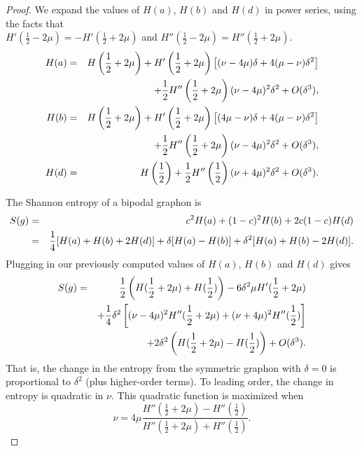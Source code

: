 \documentclass[12pt]{amsart}
\newcommand{\1}{\mathbf{1}}
\begin{document}
\begin{proof}
We expand the values of $H(a)$, $H(b)$ and $H(d)$ in power series, using the facts that \\
$H'(\frac12 - 2\mu) = -H'(\frac12 + 2\mu)$ and $H''(\frac12 - 2\mu) = H''(\frac12 + 2\mu)$. 
\begin{eqnarray}
H(a) & = & H\left (\frac12 + 2\mu \right ) + H'\left (\frac12+2\mu\right ) \left [ (\nu-4\mu)\delta + 4(\mu-\nu)\delta^2 \right ] \cr && 
+ \frac12 H''\left (\frac12+2\mu\right )(\nu-4\mu)^2 \delta^2 + O(\delta^3), \cr 
H(b) & = & H\left (\frac12 + 2\mu\right ) + H'\left (\frac12+2\mu\right ) \left [(4\mu-\nu)\delta + 4(\mu-\nu)\delta^2 \right ] \cr && 
+ \frac12 H''\left (\frac12+2\mu \right )(\nu-4\mu)^2 \delta^2 + O(\delta^3), \cr 
H(d) & = & H\left (\frac12\right ) + \frac12 H''\left (\frac12 \right ) (\nu+4\mu)^2 \delta^2 + O(\delta^3).\cr
\end{eqnarray}

The Shannon entropy of a bipodal graphon is 
\begin{eqnarray}
S(g) &=& c^2 H(a) + (1-c)^2 H(b) + 2c(1-c) H(d) \cr 
& = & \frac14[H(a)+H(b)+2H(d)] + \delta [H(a)-H(b)] + \delta^2[H(a)+H(b)-2H(d)]. 
\end{eqnarray}
Plugging in our previously computed values of $H(a)$, $H(b)$ and $H(d)$ gives
\begin{eqnarray}\label{S-is}
S(g) & = & \frac12 \left ( H(\frac12 + 2\mu) + H(\frac12) \right ) 
- 6 \delta^2 \mu H'(\frac12 + 2\mu)  \cr 
&& + \frac14 \delta^2 \left [ (\nu - 4\mu)^2 H''(\frac12 + 2\mu) + (\nu+4\mu)^2 H''(\frac12)\right ] \cr 
&& + 2\delta^2 \left ( H(\frac12 + 2\mu) - H(\frac12) \right ) + O(\delta^3).
\end{eqnarray}
That is, the change in the entropy from the symmetric graphon with $\delta=0$ is 
proportional to $\delta^2$ (plus higher-order terms). To leading order,
the change in entropy is quadratic in $\nu$. This quadratic function is maximized when 
\begin{equation}\label{nu-is} 
\nu = 4\mu \frac{H''(\frac12+2\mu) - H''(\frac12)}{H''(\frac12+2\mu) + H''(\frac12)}. 
\end{equation}


\end{proof}
\end{document}
